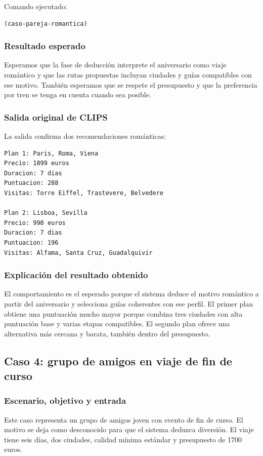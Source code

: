 \documentclass[11pt,a4paper]{article}
\begin{document}
Comando ejecutado:
\begin{verbatim}
(caso-pareja-romantica)
\end{verbatim}

\subsubsection{Resultado esperado}
Esperamos que la fase de deducci\'on interprete el aniversario como viaje
rom\'antico y que las rutas propuestas incluyan ciudades y gu\'ias compatibles
con ese motivo. Tambi\'en esperamos que se respete el presupuesto y que la
preferencia por tren se tenga en cuenta cuando sea posible.

\subsubsection{Salida original de CLIPS}
La salida confirma dos recomendaciones rom\'anticas:
\begin{verbatim}
Plan 1: Paris, Roma, Viena
Precio: 1899 euros
Duracion: 7 dias
Puntuacion: 288
Visitas: Torre Eiffel, Trastevere, Belvedere

Plan 2: Lisboa, Sevilla
Precio: 990 euros
Duracion: 7 dias
Puntuacion: 196
Visitas: Alfama, Santa Cruz, Guadalquivir
\end{verbatim}

\subsubsection{Explicaci\'on del resultado obtenido}
El comportamiento es el esperado porque el sistema deduce el motivo rom\'antico
a partir del aniversario y selecciona gu\'ias coherentes con ese perfil. El
primer plan obtiene una puntuaci\'on mucho mayor porque combina tres ciudades
con alta puntuaci\'on base y varias etapas compatibles. El segundo plan ofrece
una alternativa m\'as cercana y barata, tambi\'en dentro del presupuesto.

\subsection{Caso 4: grupo de amigos en viaje de fin de curso}
\subsubsection{Escenario, objetivo y entrada}
Este caso representa un grupo de amigos joven con evento de fin de curso. El
motivo se deja como desconocido para que el sistema deduzca diversi\'on. El viaje
tiene seis d\'ias, dos ciudades, calidad m\'inima est\'andar y presupuesto de 1700
euros.
\end{document}
